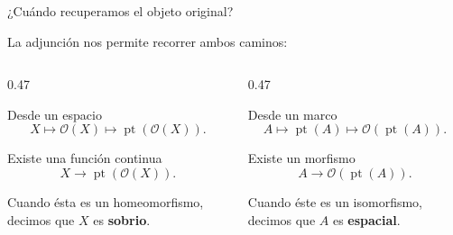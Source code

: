 \documentclass[compress,12pt]{beamer}
\begin{document}
\begin{frame}{¿Cuándo recuperamos el objeto original?}
\small{
La adjunción nos permite recorrer ambos caminos:

\medskip

\begin{columns}[T]

\begin{column}{0.47\textwidth}

\begin{block}{Desde un espacio}
\[
X
\longmapsto
\mathcal O(X)
\longmapsto
\operatorname{pt}(\mathcal O(X)).
\]

\medskip

Existe una función continua
\[
X\longrightarrow
\operatorname{pt}(\mathcal O(X)).
\]

\medskip

Cuando ésta es un homeomorfismo,
decimos que $X$ es \textbf{sobrio}.
\end{block}

\end{column}

\begin{column}{0.47\textwidth}

\begin{block}{Desde un marco}
\[
A
\longmapsto
\operatorname{pt}(A)
\longmapsto
\mathcal O(\operatorname{pt}(A)).
\]

\medskip

Existe un morfismo
\[
A\longrightarrow
\mathcal O(\operatorname{pt}(A)).
\]

\medskip

Cuando éste es un isomorfismo,
decimos que $A$ es \textbf{espacial}.
\end{block}

\end{column}

\end{columns}

\pause

\vfill

\begin{center}
\end{center}
}
\end{frame}
\end{document}
